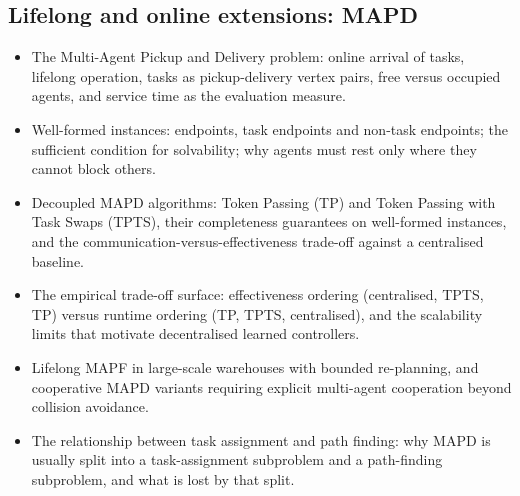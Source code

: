 \subsection{Lifelong and online extensions: MAPD}
\begin{itemize}
  \item The Multi-Agent Pickup and Delivery problem: online arrival of
        tasks, lifelong operation, tasks as pickup-delivery vertex pairs,
        free versus occupied agents, and service time as the evaluation
        measure.
  \item Well-formed instances: endpoints, task endpoints and non-task
        endpoints; the sufficient condition for solvability; why agents must
        rest only where they cannot block others.
  \item Decoupled MAPD algorithms: Token Passing (TP) and Token Passing with
        Task Swaps (TPTS), their completeness guarantees on well-formed
        instances, and the communication-versus-effectiveness trade-off
        against a centralised baseline.
  \item The empirical trade-off surface: effectiveness ordering (centralised,
        TPTS, TP) versus runtime ordering (TP, TPTS, centralised), and the
        scalability limits that motivate decentralised learned controllers.
  \item Lifelong MAPF in large-scale warehouses with bounded re-planning,
        and cooperative MAPD variants requiring explicit multi-agent
        cooperation beyond collision avoidance.
  \item The relationship between task assignment and path finding: why MAPD
        is usually split into a task-assignment subproblem and a path-finding
        subproblem, and what is lost by that split.
\end{itemize}

